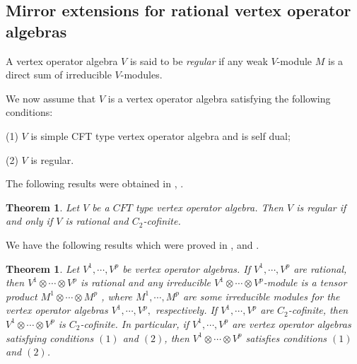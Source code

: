 \documentclass{article}
\newtheorem{theorem}[lemma]{Theorem}
\newtheorem{definition}[lemma]{Definition}
\begin{document}
\subsection{Mirror extensions for rational vertex operator algebras}
A vertex operator algebra $V$ is said to be {\em regular} if any weak $V$-module
$M$ is a direct sum of irreducible $V$-modules.

We now assume that $V$ is a  vertex operator algebra satisfying the following conditions:

(1) $V$ is simple CFT type vertex operator algebra  and is self dual;%

(2) $V$ is regular.

The following results were obtained in \cite{ABD}, \cite{L}.
\begin{theorem}
Let $V$ be a $CFT$ type vertex operator algebra. Then $V$ is regular if and only if $V$ is rational and $C_2$-cofinite.
\end{theorem}

We have the
following results which were proved in \cite{FHL}, \cite{DMZ} and \cite{ABD}.
\begin{theorem}\label{kvoa3}
Let $V^1, \cdots, V^p$ be  vertex operator algebras. If $V^1, \cdots, V^p$ are rational, then
$V^1\otimes \cdots \otimes V^p$  is rational and any irreducible $V^1\otimes \cdots \otimes V^p$-module is a tensor
product $M^1\otimes \cdots \otimes M^p$ , where $M^1, \cdots, M^p$ are
some irreducible modules for the vertex operator algebras $V^1,
\cdots, V^p,$ respectively. If $V^1, \cdots, V^p$ are $C_2$-cofinite, then $V^1\otimes \cdots \otimes V^p$  is $C_2$-cofinite.
In particular, if $V^1, \cdots, V^p$ are  vertex operator algebras satisfying conditions $(1)$ and $(2)$, then $V^1\otimes \cdots \otimes V^p$ satisfies conditions $(1)$ and $(2)$.
\end{theorem}    

\end{document}
